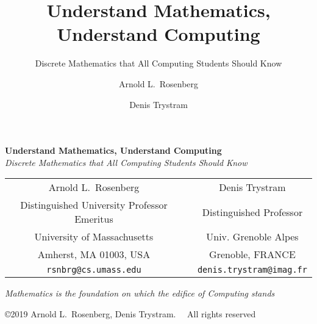 \documentclass[envcountchap]{svmono}
\begin{document}



\author{Arnold L.~Rosenberg \and Denis Trystram}
\title{Understand Mathematics, Understand Computing}
\subtitle{Discrete Mathematics that All Computing Students Should Know}

\maketitle

\begin{center}
{\Large\bf Understand Mathematics, Understand Computing} \\
{\large\it Discrete Mathematics that All Computing Students Should Know}
\end{center}


\begin{center}
\begin{tabular}{ccc}
{\large Arnold L.~Rosenberg} & & {\large Denis Trystram} \\
Distinguished University Professor Emeritus
  & & Distinguished Professor \\
University of Massachusetts  & & Univ. Grenoble Alpes \\
Amherst, MA 01003, USA       & & Grenoble, FRANCE \\
{\small\tt rsnbrg@cs.umass.edu} & & {\small\tt denis.trystram@imag.fr}
\end{tabular}
\end{center}

\vspace*{.25in}

{\it Mathematics is the foundation on which the edifice of Computing
  stands}

\begin{figure}[h]
\centerline{}
\end{figure}


\begin{center}
{\small \copyright 2019 Arnold L.~Rosenberg, Denis Trystram}. \ \
{\small All rights reserved}
\end{center}


\frontmatter

%

%

\tableofcontents

\end{document}

